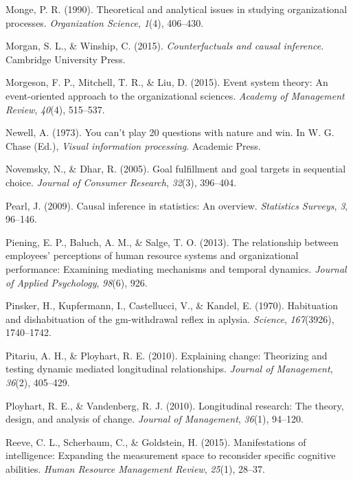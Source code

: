 \documentclass[english,,man]{apa6}
\theoremstyle{definition}
\theoremstyle{definition}
\theoremstyle{definition}
\theoremstyle{remark}
\begin{document}
\leavevmode\hypertarget{ref-monge1990}{}%
Monge, P. R. (1990). Theoretical and analytical issues in studying
organizational processes. \emph{Organization Science}, \emph{1}(4),
406--430.

\leavevmode\hypertarget{ref-morgan2015}{}%
Morgan, S. L., \& Winship, C. (2015). \emph{Counterfactuals and causal
inference}. Cambridge University Press.

\leavevmode\hypertarget{ref-morgeson2015}{}%
Morgeson, F. P., Mitchell, T. R., \& Liu, D. (2015). Event system
theory: An event-oriented approach to the organizational sciences.
\emph{Academy of Management Review}, \emph{40}(4), 515--537.

\leavevmode\hypertarget{ref-newell1973}{}%
Newell, A. (1973). You can't play 20 questions with nature and win. In
W. G. Chase (Ed.), \emph{Visual information processing}. Academic Press.

\leavevmode\hypertarget{ref-novemsky2005}{}%
Novemsky, N., \& Dhar, R. (2005). Goal fulfillment and goal targets in
sequential choice. \emph{Journal of Consumer Research}, \emph{32}(3),
396--404.

\leavevmode\hypertarget{ref-Pearl2009}{}%
Pearl, J. (2009). Causal inference in statistics: An overview.
\emph{Statistics Surveys}, \emph{3}, 96--146.

\leavevmode\hypertarget{ref-piening2013}{}%
Piening, E. P., Baluch, A. M., \& Salge, T. O. (2013). The relationship
between employees' perceptions of human resource systems and
organizational performance: Examining mediating mechanisms and temporal
dynamics. \emph{Journal of Applied Psychology}, \emph{98}(6), 926.

\leavevmode\hypertarget{ref-pinsker1970}{}%
Pinsker, H., Kupfermann, I., Castellucci, V., \& Kandel, E. (1970).
Habituation and dishabituation of the gm-withdrawal reflex in aplysia.
\emph{Science}, \emph{167}(3926), 1740--1742.

\leavevmode\hypertarget{ref-Pitariu2010}{}%
Pitariu, A. H., \& Ployhart, R. E. (2010). Explaining change: Theorizing
and testing dynamic mediated longitudinal relationships. \emph{Journal
of Management}, \emph{36}(2), 405--429.

\leavevmode\hypertarget{ref-Ployhart2010}{}%
Ployhart, R. E., \& Vandenberg, R. J. (2010). Longitudinal research: The
theory, design, and analysis of change. \emph{Journal of Management},
\emph{36}(1), 94--120.

\leavevmode\hypertarget{ref-reeve2015}{}%
Reeve, C. L., Scherbaum, C., \& Goldstein, H. (2015). Manifestations of
intelligence: Expanding the measurement space to reconsider specific
cognitive abilities. \emph{Human Resource Management Review},
\emph{25}(1), 28--37.
\end{document}
